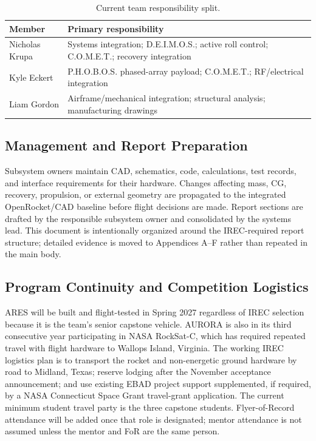 \documentclass[10pt]{article}
\newcommand{\COMET}{C.O.M.E.T.}
\newcommand{\DEIMOS}{D.E.I.M.O.S.}
\newcommand{\PHOBOS}{P.H.O.B.O.S.}
\begin{document}
\begin{table}[ht]
\centering
\caption{Current team responsibility split.}
\begin{tabularx}{\linewidth}{@{}lX@{}}
\toprule
\textbf{Member} & \textbf{Primary responsibility} \\
\midrule
Nicholas Krupa & Systems integration; \DEIMOS{}; active roll control; \COMET{}; recovery integration \\
Kyle Eckert & \PHOBOS{} phased-array payload; \COMET{}; RF/electrical integration \\
Liam Gordon & Airframe/mechanical integration; structural analysis; manufacturing drawings \\
\bottomrule
\end{tabularx}
\end{table}

\subsection{Management and Report Preparation}
Subsystem owners maintain CAD, schematics, code, calculations, test records, and interface requirements for their hardware. Changes affecting mass, CG, recovery, propulsion, or external geometry are propagated to the integrated OpenRocket/CAD baseline before flight decisions are made. Report sections are drafted by the responsible subsystem owner and consolidated by the systems lead. This document is intentionally organized around the IREC-required report structure; detailed evidence is moved to Appendices A--F rather than repeated in the main body.

\subsection{Program Continuity and Competition Logistics}
ARES will be built and flight-tested in Spring 2027 regardless of IREC selection because it is the team's senior capstone vehicle. AURORA is also in its third consecutive year participating in NASA RockSat-C, which has required repeated travel with flight hardware to Wallops Island, Virginia. The working IREC logistics plan is to transport the rocket and non-energetic ground hardware by road to Midland, Texas; reserve lodging after the November acceptance announcement; and use existing EBAD project support supplemented, if required, by a NASA Connecticut Space Grant travel-grant application. The current minimum student travel party is the three capstone students. Flyer-of-Record attendance will be added once that role is designated; mentor attendance is not assumed unless the mentor and FoR are the same person.
\end{document}

